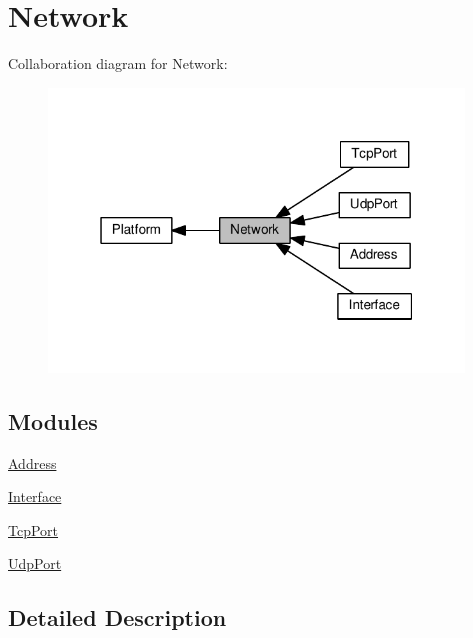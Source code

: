 \hypertarget{group__network}{}\section{Network}
\label{group__network}
Collaboration diagram for Network\+:\nopagebreak
\begin{figure}[H]
\begin{center}
\leavevmode
\includegraphics[width=313pt]{group__network}
\end{center}
\end{figure}
\subsection*{Modules}
\begin{DoxyCompactItemize}
\item 
\hyperlink{group__address}{Address}
\item 
\hyperlink{group__interface}{Interface}
\item 
\hyperlink{group__tcp}{Tcp\+Port}
\item 
\hyperlink{group__udp}{Udp\+Port}
\end{DoxyCompactItemize}


\subsection{Detailed Description}
